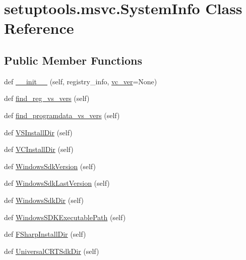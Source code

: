 \hypertarget{classsetuptools_1_1msvc_1_1SystemInfo}{}\section{setuptools.\+msvc.\+System\+Info Class Reference}
\label{classsetuptools_1_1msvc_1_1SystemInfo}
\subsection*{Public Member Functions}
\begin{DoxyCompactItemize}
\item 
def \hyperlink{classsetuptools_1_1msvc_1_1SystemInfo_a8811d62e19a741da177fc8c4cfe180bc}{\+\_\+\+\_\+init\+\_\+\+\_\+} (self, registry\+\_\+info, \hyperlink{classsetuptools_1_1msvc_1_1SystemInfo_aaf63b691809f5893000733170c79d98d}{vc\+\_\+ver}=None)
\item 
def \hyperlink{classsetuptools_1_1msvc_1_1SystemInfo_a42a64434029bf4c65c33a728e3abdd3a}{find\+\_\+reg\+\_\+vs\+\_\+vers} (self)
\item 
def \hyperlink{classsetuptools_1_1msvc_1_1SystemInfo_a792a86db9531bdf7d530fd9104026ec7}{find\+\_\+programdata\+\_\+vs\+\_\+vers} (self)
\item 
def \hyperlink{classsetuptools_1_1msvc_1_1SystemInfo_aa117395fa193bff19dde5fbb4cf6e3a3}{V\+S\+Install\+Dir} (self)
\item 
def \hyperlink{classsetuptools_1_1msvc_1_1SystemInfo_a64320eef8ba2ab8929cb03aa8308fc2d}{V\+C\+Install\+Dir} (self)
\item 
def \hyperlink{classsetuptools_1_1msvc_1_1SystemInfo_ae7566034b3ec2e80c3bf9d6d9289dc1b}{Windows\+Sdk\+Version} (self)
\item 
def \hyperlink{classsetuptools_1_1msvc_1_1SystemInfo_a379cb993ab7a7634c5806a4646a3cb15}{Windows\+Sdk\+Last\+Version} (self)
\item 
def \hyperlink{classsetuptools_1_1msvc_1_1SystemInfo_a2aaf265345e0e8438533c8a325b57e7f}{Windows\+Sdk\+Dir} (self)
\item 
def \hyperlink{classsetuptools_1_1msvc_1_1SystemInfo_a7a8b2e20afb2590c88e26c002bd8a365}{Windows\+S\+D\+K\+Executable\+Path} (self)
\item 
def \hyperlink{classsetuptools_1_1msvc_1_1SystemInfo_a9a5c0f4de906f3fcb09d6e2ca3f37d43}{F\+Sharp\+Install\+Dir} (self)
\item 
def \hyperlink{classsetuptools_1_1msvc_1_1SystemInfo_afb81ca0402cf16fb2ee7d2a8867ee604}{Universal\+C\+R\+T\+Sdk\+Dir} (self)

\end{DoxyCompactItemize}
